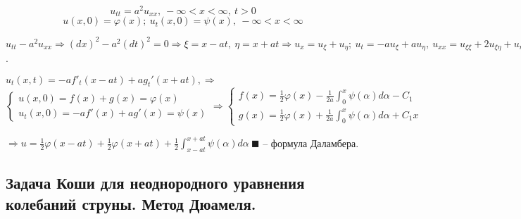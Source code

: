 \documentclass[9pt]{article}
\begin{document}
\ 
\begin{equation}
    u_{tt}=a^2u_{xx},\ -\infty<x<\infty,\ t>0
\end{equation}
\begin{equation}
    u(x,0)=\varphi(x);\ u_t(x,0)=\psi(x),\ -\infty<x<\infty
\end{equation}
\par\(u_{tt}-a^2u_{xx}\Rightarrow (dx)^2-a^2(dt)^2=0\Rightarrow\xi=x-at,\ \eta=x+at\Rightarrow u_x=u_\xi+u_\eta;\ u_t=-au_\xi+au_\eta,\ u_{xx}=u_{\xi\xi}+2u_{\xi\eta}+u_{\eta\eta};\ u_{tt}=a^2u_{\xi\xi}+2a^2u_{\xi\eta}+a^2u_{\eta\eta}\Rightarrow u_{\xi\eta}=0,\ u=f(x-at)+g(x+at)\).
\par\(u_t(x,t)=-af'_t(x-at)+ag_t'(x+at),\Rightarrow\)
\[\left\{
\begin{array}{l}
    u(x,0)=f(x)+g(x)=\varphi(x) \\
    u_t(x,0)=-af'(x)+ag'(x)=\psi(x)
\end{array}\right.
\Rightarrow
\left\{
\begin{array}{l}
    f(x)=\frac{1}{2}\varphi(x)-\frac{1}{2a}\int_0^x\psi(\alpha)d\alpha-C_1 \\
    g(x)=\frac{1}{2}\varphi(x)+\frac{1}{2a}\int_0^x\psi(\alpha)d\alpha+C_1x
\end{array}\right.\]
\par\(\Rightarrow u=\frac{1}{2}\varphi(x-at)+\frac{1}{2}\varphi(x+at)+\frac{1}{2}\int_{x-at}^{x+at}\psi(\alpha)d\alpha\ \blacksquare\) -- формула Даламбера.

\subsection{Задача Коши для неоднородного уравнения колебаний струны. Метод Дюамеля.}
\end{document}
